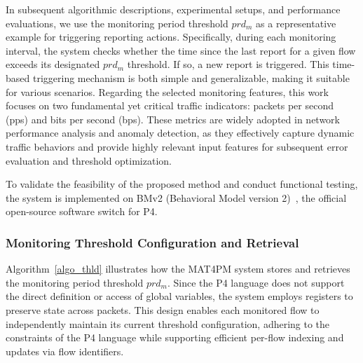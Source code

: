 In subsequent algorithmic descriptions, experimental setups, and performance evaluations, we use the monitoring period threshold $prd_m$ as a representative example for triggering reporting actions. 
Specifically, during each monitoring interval, the system checks whether the time since the last report for a given flow exceeds its designated $prd_m$ threshold. 
If so, a new report is triggered. 
This time-based triggering mechanism is both simple and generalizable, making it suitable for various scenarios. 
Regarding the selected monitoring features, this work focuses on two fundamental yet critical traffic indicators: packets per second (pps) and bits per second (bps). 
These metrics are widely adopted in network performance analysis and anomaly detection, as they effectively capture dynamic traffic behaviors and provide highly relevant input features for subsequent error evaluation and threshold optimization.

To validate the feasibility of the proposed method and conduct functional testing, the system is implemented on BMv2 (Behavioral Model version 2)~\cite{BMv2}, the official open-source software switch for P4. 

\subsubsection{Monitoring Threshold Configuration and Retrieval}

Algorithm~\ref{algo_thld} illustrates how the MAT4PM system stores and retrieves the monitoring period threshold $prd_m$. 
Since the P4 language does not support the direct definition or access of global variables, the system employs registers to preserve state across packets. 
This design enables each monitored flow to independently maintain its current threshold configuration, adhering to the constraints of the P4 language while supporting efficient per-flow indexing and updates via flow identifiers.

